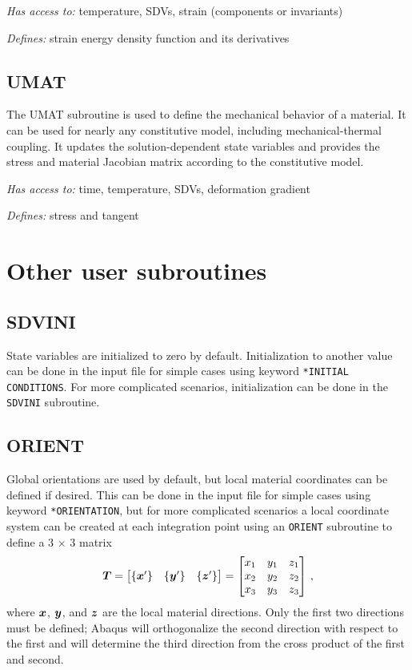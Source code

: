 \documentclass[10pt,letterpaper,oneside]{report}
\newcommand{\ten}[1]{\mbox{\boldmath $#1$}{}}
\begin{document}
\emph{Has access to:} temperature, SDVs, strain (components or invariants)

\emph{Defines:} strain energy density function and its derivatives

\subsection{UMAT}
The UMAT subroutine is used to define the mechanical behavior of a material.  It can be used for nearly any constitutive model, including mechanical-thermal coupling.  It updates the solution-dependent state variables and provides the stress and material Jacobian matrix according to the constitutive model.  

\emph{Has access to:} time, temperature, SDVs, deformation gradient

\emph{Defines:} stress and tangent


\newpage
\section{Other user subroutines}

\subsection{SDVINI}
State variables are initialized to zero by default.  Initialization to another value can be done in the input file for simple cases using keyword \texttt{*INITIAL CONDITIONS}.  For more complicated scenarios, initialization can be done in the \texttt{SDVINI} subroutine.


\subsection{ORIENT}
Global orientations are used by default, but local material coordinates can be defined if desired.  This can be done in the input file for simple cases using keyword \texttt{*ORIENTATION}, but for more complicated scenarios a local coordinate system can be created at each integration point using an \texttt{ORIENT} subroutine to define a 3 $\times$ 3 matrix 
\begin{equation}
\ten{T} = \begin{bmatrix} 
\{ \ten{x}' \} & \{ \ten{y}' \} & \{ \ten{z}' \}  
\end{bmatrix}
= \begin{bmatrix} 
x_1 & y_1 & z_1 \\
x_2 & y_2 & z_2 \\
x_3 & y_3 & z_3 
\end{bmatrix} \, ,
\end{equation}
where $\ten{x}$, $\ten{y}$, and $\ten{z}$ are the local material directions.  Only the first two directions must be defined; Abaqus will orthogonalize the second direction with respect to the first and will determine the third direction from the cross product of the first and second.  
\end{document}
